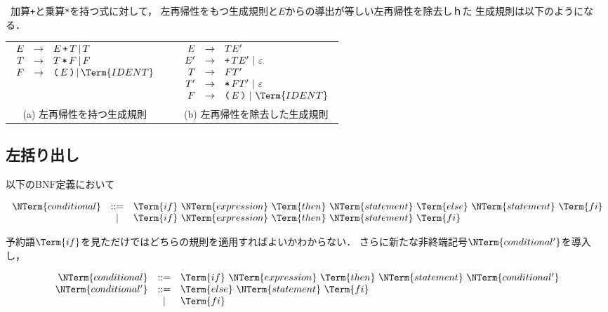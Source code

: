 \documentclass[dvipdfmx,a4j]{jbook}
\begin{document}
\begin{Exmp}\ 加算\texttt{+}と乗算\texttt{*}を持つ式に対して，
  左再帰性をもつ生成規則と$E$からの導出が等しい左再帰性を除去しｈた
  生成規則は以下のようになる．
  \begin{center}
  \begin{tabular}{ccc}
    $\begin{array}{rcl}
      E & \rightarrow & E\,\texttt{+}\,T\,|\,T\\
      T & \rightarrow & T\,\texttt{*}\,F\,|\,F\\
      F & \rightarrow & \texttt{(}\,E\,\texttt{)}\,|\,\Term{IDENT}
    \end{array}$
    & &
    $\begin{array}{rcl}
      E & \rightarrow & TE'\\
      E'& \rightarrow & \texttt{+}\,TE'\ |\ \varepsilon\\
      T & \rightarrow & FT'\\
      T'& \rightarrow & \texttt{*}\,FT'\ |\ \varepsilon\\
      F & \rightarrow & \texttt{(}\,E\,\texttt{)}\ |\ \Term{IDENT}
    \end{array}$\\
     (a) 左再帰性を持つ生成規則 & & (b) 左再帰性を除去した生成規則
  \end{tabular}
\end{center}
\end{Exmp}

\subsection{左括り出し}

以下のBNF定義において

\[\begin{array}{rcl}
  \NTerm{conditional} & \mathtt{::=} & \Term{if}\ \NTerm{expression}\ \Term{then}\ \NTerm{statement}\ \Term{else}\ \NTerm{statement}\ \Term{fi}\\
  & | & \Term{if}\ \NTerm{expression}\ \Term{then}\ \NTerm{statement}\ \Term{fi}
\end{array}\]

予約語$\Term{if}$を見ただけではどちらの規則を適用すればよいかわからない．
さらに新たな非終端記号$\NTerm{conditional'}$を導入し，

\[\begin{array}{rcl}
  \NTerm{conditional} & \mathtt{::=} & \Term{if}\ \NTerm{expression}\ \Term{then}\ \NTerm{statement}\ \NTerm{conditional'}\\
  \NTerm{conditional'}& \mathtt{::=} & \Term{else}\ \NTerm{statement}\ \Term{fi}\\
  & | & \Term{fi}
\end{array}\]
\end{document}
